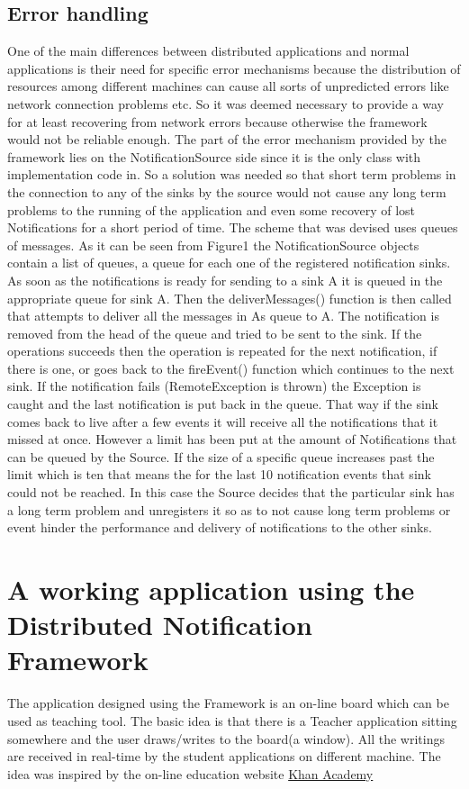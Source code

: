 \documentclass[a4paper,12pt,titlepage]{article}
\begin{document}
\subsection{Error handling}
One of the main differences between distributed applications and normal applications is their need for specific error mechanisms because the distribution of resources among different machines can cause all sorts of unpredicted errors like network connection problems etc. So it was deemed necessary to provide a way for at least recovering from network errors because otherwise the framework would not be reliable enough. The part of the error mechanism provided by the framework lies on the NotificationSource side since it is the only class with implementation code in. So a solution was needed so that short term problems in the connection to any of the sinks by the source would not cause any long term problems to the running of the application and even some recovery of lost Notifications for a short period of time. The scheme that was devised uses queues of messages. As it can be seen from Figure1 the NotificationSource objects contain a list of queues, a queue for each one of the registered notification sinks. As soon as the notifications is ready for sending to a sink A it is queued in the appropriate queue for sink A. Then the deliverMessages() function is then called that attempts to deliver all the messages in As queue to A.  The notification is removed from the head of the queue and tried to be sent to the sink. If the operations succeeds then the operation is repeated for the next notification, if there is one, or goes back to the fireEvent() function which continues to the next sink. If the notification fails (RemoteException is thrown) the Exception is caught and the last notification is put back in the queue. That way if the sink comes back to live after a few events it will receive all the notifications that it missed at once. However a limit has been put at the amount of Notifications that can be queued by the Source. If the size of a specific queue increases past the limit which is ten that means the for the last 10 notification events that sink could not be reached. In this case the Source decides that the particular sink has a long term problem and unregisters it so as to not cause long term problems or event hinder the performance and delivery of notifications to the other sinks. 
\section{A working application using the Distributed Notification Framework}
The application designed using the Framework is an on-line board which can be used as teaching tool. The basic idea is that there is a Teacher application sitting somewhere and the user draws/writes to the board(a window). All the writings are received in real-time by the student applications on different machine. The idea was inspired by the on-line education website \href{http://www.khanacademy.org/}{Khan Academy}
\end{document}
